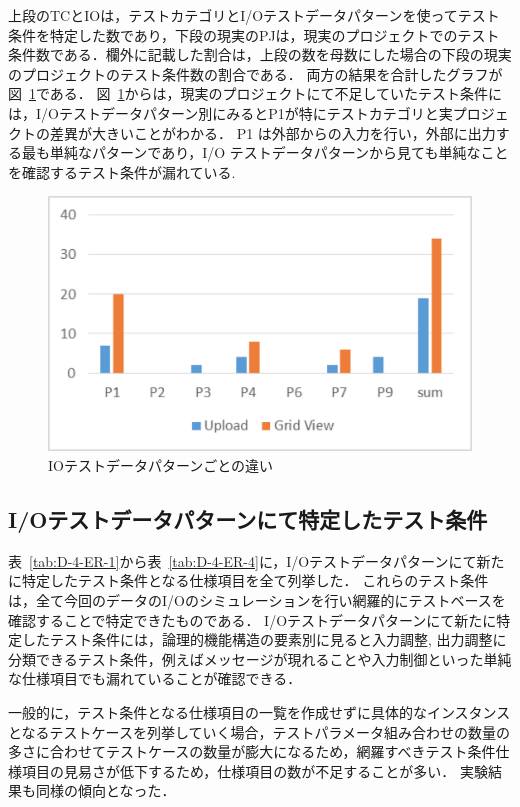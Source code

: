 上段のTCとIOは，テストカテゴリとI/Oテストデータパターンを使ってテスト条件を特定した数であり，下段の現実のPJは，現実のプロジェクトでのテスト条件数である．欄外に記載した割合は，上段の数を母数にした場合の下段の現実のプロジェクトのテスト条件数の割合である．
両方の結果を合計したグラフが図~\ref{fig:D-4-Fig11}である．
図~\ref{fig:D-4-Fig11}からは，現実のプロジェクトにて不足していたテスト条件には，I/Oテストデータパターン別にみるとP1が特にテストカテゴリと実プロジェクトの差異が大きいことがわかる．
P1 は外部からの入力を行い，外部に出力する最も単純なパターンであり，I/O テストデータパターンから見ても単純なことを確認するテスト条件が漏れている.

\begin{figure}[htbp]
\begin{center}
\includegraphics[width=12cm]{./image/D-4-Fig11.png}
\caption{IOテストデータパターンごとの違い}
\label{fig:D-4-Fig11}
\end{center}
\end{figure}

\subsection{I/Oテストデータパターンにて特定したテスト条件}
表~\ref{tab:D-4-ER-1}から表~\ref{tab:D-4-ER-4}に，I/Oテストデータパターンにて新たに特定したテスト条件となる仕様項目を全て列挙した．
これらのテスト条件は，全て今回のデータのI/Oのシミュレーションを行い網羅的にテストベースを確認することで特定できたものである．
I/Oテストデータパターンにて新たに特定したテスト条件には，論理的機能構造の要素別に見ると入力調整, 出力調整に分類できるテスト条件，例えばメッセージが現れることや入力制御といった単純な仕様項目でも漏れていることが確認できる．

一般的に，テスト条件となる仕様項目の一覧を作成せずに具体的なインスタンスとなるテストケースを列挙していく場合，テストパラメータ組み合わせの数量の多さに合わせてテストケースの数量が膨大になるため，網羅すべきテスト条件仕様項目の見易さが低下するため，仕様項目の数が不足することが多い．
実験結果も同様の傾向となった．

